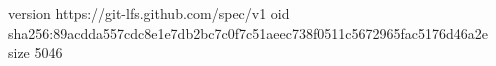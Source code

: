 version https://git-lfs.github.com/spec/v1
oid sha256:89acdda557cdc8e1e7db2bc7c0f7c51aeec738f0511c5672965fac5176d46a2e
size 5046
